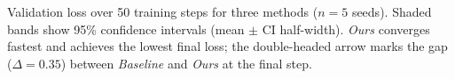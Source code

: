 \caption{Validation loss over 50 training steps for three methods ($n{=}5$ seeds). Shaded bands show 95\% confidence intervals (mean $\pm$ CI half-width). \textit{Ours} converges fastest and achieves the lowest final loss; the double-headed arrow marks the gap ($\Delta{=}0.35$) between \textit{Baseline} and \textit{Ours} at the final step.}
